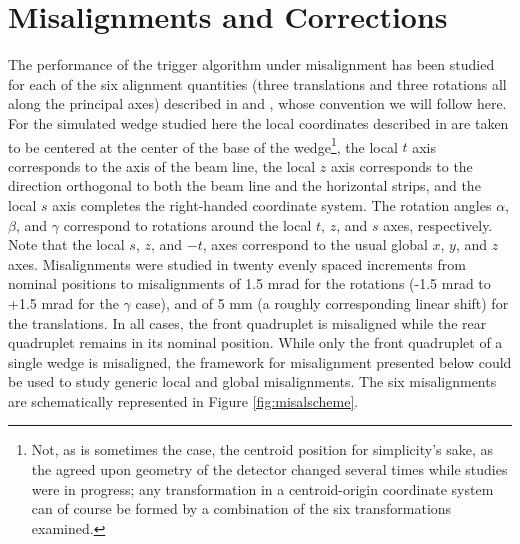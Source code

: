 \section{Misalignments and Corrections}
\label{sec:mal}
The performance of the trigger algorithm under misalignment has been studied for each of the six alignment quantities (three translations and three rotations all along the principal axes) described in \cite{Chevalier:684070} and \cite{Chevalier:684070}, whose convention we will follow here.  For the simulated wedge studied here the local coordinates described in \cite{Chevalier:684070} are taken to be centered at the center of the base of the wedge\footnote{Not, as is sometimes the case, the centroid position for simplicity's sake, as the agreed upon geometry of the detector changed several times while studies were in progress; any  transformation in a centroid-origin coordinate system can of course be formed by a combination of the six transformations examined.}, the local $t$ axis corresponds to the axis of the beam line, the local $z$ axis corresponds to the direction orthogonal to both the beam line and the horizontal strips, and the local $s$ axis completes the right-handed coordinate system.  The rotation angles $\alpha$, $\beta$, and $\gamma$ correspond to rotations around the local $t$, $z$, and $s$ axes, respectively.  Note that the local $s$, $z$, and $-t$, axes correspond to the usual global $x$, $y$, and $z$ axes.  Misalignments were studied in twenty evenly spaced increments from nominal positions to misalignments of 1.5 mrad for the rotations (-1.5 mrad to +1.5 mrad for the $\gamma$ case), and of 5 mm (a roughly corresponding linear shift) for the translations.  In all cases, the front quadruplet is misaligned while the rear quadruplet remains in its nominal position.  While only the front quadruplet of a single wedge is misaligned, the framework for misalignment presented below could be used to study generic local and global misalignments.  The six misalignments are schematically represented in Figure \ref{fig:misalscheme}.  
